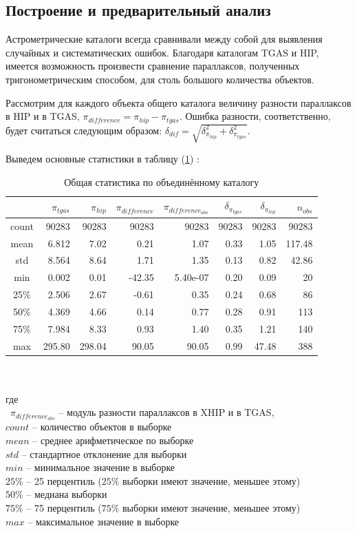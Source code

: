 \documentclass[14pt]{article} %
\begin{document}
\subsection{Построение и предварительный анализ}\label{errvid}

Астрометрические каталоги всегда сравнивали между собой для выявления случайных и систематических ошибок. Благодаря каталогам TGAS и HIP, имеется возможность произвести сравнение параллаксов, полученных тригонометрическим способом, для столь большого количества объектов.

Рассмотрим для каждого объекта общего каталога величину разности параллаксов в HIP и в TGAS, $\pi_{difference} = \pi_{hip} - \pi_{tgas}$. Ошибка разности, соответственно, будет считаться следующим образом: $\delta_{dif} = \sqrt{\delta^2_{\pi_{hip}} + \delta^2_{\pi_{tgas}}}$. 

Выведем основные статистики в таблицу (\ref{tabular:tgas_st}) :

\begin{table}[h!]
\caption{Общая статистика по объединённому каталогу}
\label{tabular:tgas_st}
\begin{tabular}{c|r|r|r|r|r|r|r}
\hline 	
&$\pi_{tgas}$&$\pi_{hip}$&$\pi_{difference}$&$\pi_{difference_{abs}}$&$\delta_{\pi_{tgas}}$&$\delta_{\pi_{hip}}$&$n_{obs}$\\
\hline
\hline 	
count&90283&90283&90283&90283&90283&90283&90283\\
\hline 
mean&6.812&7.02&0.21&1.07&0.33&1.05&117.48\\
std&8.564&8.64&1.71&1.35&0.13&0.82&42.86\\
min&0.002&0.01&-42.35&5.40e-07&0.20&0.09&20\\
25\%&2.506&2.67&-0.61&0.35&0.24&0.68&86\\
50\%&4.369&4.66&0.14&0.77&0.28&0.91&113\\
75\%&7.984&8.33&0.93&1.40&0.35&1.21&140\\
max&295.80&298.04&90.05&90.05&0.99&47.48&388\\
\end{tabular}\\{\\где\\
~$\pi_{difference_{abs}}$ -- модуль разности параллаксов в XHIP и в TGAS,\\
$count$ -- количество объектов в выборке\\
$mean$ -- среднее арифметическое по выборке\\
$std$ -- стандартное отклонение для выборки\\
$min$ -- минимальное значение в выборке\\
$25\%$ -- 25 перцентиль ($25\%$ выборки имеют значение, меньшее этому)\\
$50\%$ -- медиана выборки\\
$75\%$ -- 75 перцентиль ($75\%$ выборки имеют значение, меньшее этому)\\
$max$ -- максимальное значение в выборке}
\end{table}
\end{document}
